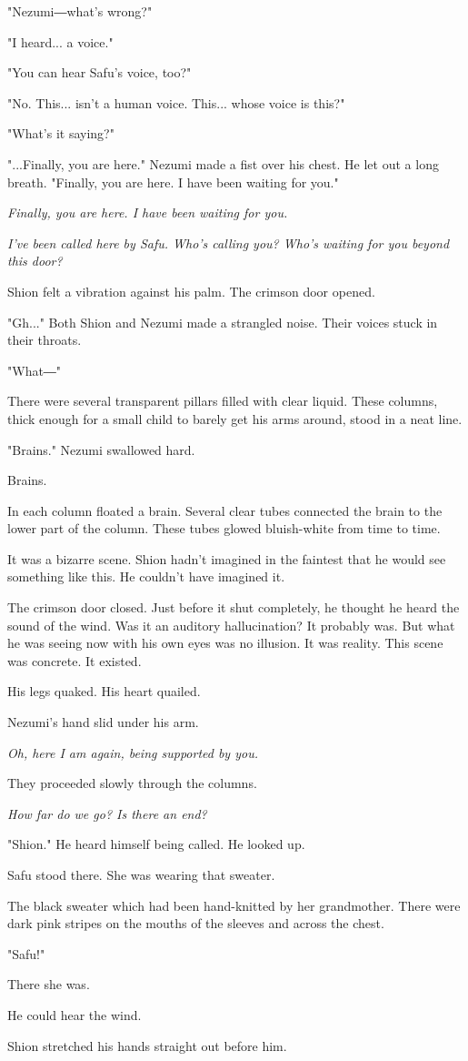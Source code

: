"Nezumi―what's wrong?"

"I heard... a voice."

"You can hear Safu's voice, too?"

"No. This... isn't a human voice. This... whose voice is this?"

"What's it saying?"

"...Finally, you are here." Nezumi made a fist over his chest. He let
out a long breath. "Finally, you are here. I have been waiting for you."

\emph{Finally, you are here. I have been waiting for you.}

\myspace

\emph{I've been called here by Safu. Who's calling you? Who's waiting for you
	beyond this door?}

Shion felt a vibration against his palm. The crimson door opened.

"Gh..." Both Shion and Nezumi made a strangled noise. Their voices stuck
in their throats.

"What―"

There were several transparent pillars filled with clear liquid. These
columns, thick enough for a small child to barely get his arms around,
stood in a neat line.

"Brains." Nezumi swallowed hard.

Brains.

In each column floated a brain. Several clear tubes connected the brain
to the lower part of the column. These tubes glowed bluish-white from
time to time.

It was a bizarre scene. Shion hadn't imagined in the faintest that he
would see something like this. He couldn't have imagined it.

The crimson door closed. Just before it shut completely, he thought he
heard the sound of the wind. Was it an auditory hallucination? It
probably was. But what he was seeing now with his own eyes was no
illusion. It was reality. This scene was concrete. It existed.

His legs quaked. His heart quailed.

Nezumi's hand slid under his arm.

\emph{Oh, here I am again, being supported by you.}

They proceeded slowly through the columns.

\emph{How far do we go? Is there an end?}

"Shion." He heard himself being called. He looked up.

Safu stood there. She was wearing that sweater.

The black sweater which had been hand-knitted by her grandmother. There
were dark pink stripes on the mouths of the sleeves and across the
chest.

"Safu!"

There she was.

He could hear the wind.

Shion stretched his hands straight out before him.